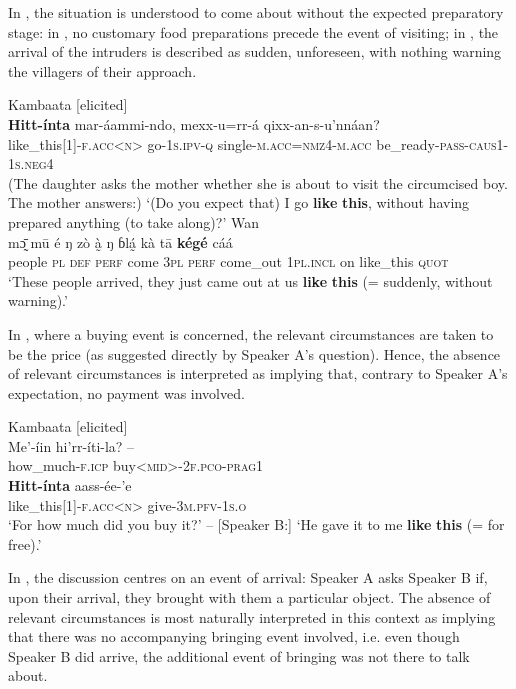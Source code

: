 \documentclass[output=paper,colorlinks,citecolor=brown]{langscibook}
\begin{document}
In , the situation is understood to come about without the expected preparatory stage: in , no customary food preparations precede the event of visiting; in , the arrival of the intruders is described as sudden, unforeseen, with nothing warning the villagers of their approach.

\ea\label{ex:nikitina:7}
\ea\label{ex:nikitina:7a} {Kambaata [elicited]}\\
\gll \textbf{Hitt-ínta} mar-áammi-ndo, mexx-u=rr-á qixx-an-s-u’nnáan?\\
     like\_this[1]\textsc{{}-f.acc<n>} go-\textsc{1s.ipv-q} single-\textsc{m.acc}=\textsc{nmz4}{}-\textsc{m.acc} be\_ready-\textsc{pass}{}-\textsc{caus1}{}-\textsc{1s.neg4}\\
\glt (The daughter asks the mother whether she is about to visit the circumcised boy. The mother answers:) ‘(Do you expect that) I go \textbf{like} \textbf{this}, without having prepared anything (to take along)?’ 
\ex\label{ex:nikitina:7b} {Wan}\\
\gll m\={ɔ̰} mū é ŋ zò à̰ ŋ ɓlá̰  kà tā \textbf{kégé} cáá\\
     people \textsc{pl} \textsc{def} \textsc{perf} come \textsc{3pl} \textsc{perf} come\_out \textsc{1pl.incl} on like\_this \textsc{quot}\\
\glt [Saying:] ‘These people arrived, they just came out at us \textbf{like} \textbf{this} (= suddenly, without warning).’
\z
\z

In , where a buying event is concerned, the relevant circumstances are taken to be the price (as suggested directly by Speaker A’s question). Hence, the absence of relevant circumstances is interpreted as implying that, contrary to Speaker A’s expectation, no payment was involved.

\ea\label{ex:nikitina:8} {Kambaata [elicited]}\\
\gll Me’-íin hi’rr-íti-la? – \\
     how\_much-\textsc{f.icp} buy<\textsc{mid}>-\textsc{2f.pco-prag1}\\
\gll \textbf{Hitt-ínta} aass-ée-’e\\
     like\_this[1]\textsc{{}-f.acc<n>} give-\textsc{3m.pfv}{}-\textsc{1s.o}\\
\glt [Speaker A:] ‘For how much did you buy it?’ – [Speaker B:] ‘He gave it to me \textbf{like} \textbf{this} (= for free).’ 
\z

In , the discussion centres on an event of arrival: Speaker A asks Speaker B if, upon their arrival, they brought with them a particular object. The absence of relevant circumstances is most naturally interpreted in this context as implying that there was no accompanying bringing event involved, i.e. even though Speaker B did arrive, the additional event of bringing was not there to talk about.
\end{document}
